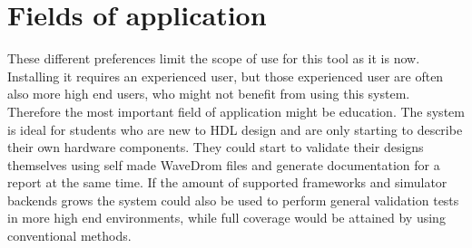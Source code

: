 \section{Fields of application}
These different preferences limit the scope of use for this tool as it is now. Installing it requires an experienced user, but those experienced user are often also more high end users, who might not benefit from using this system. Therefore the most important field of application might be education. The system is ideal for students who are new to HDL design and are only starting to describe their own hardware components. They could start to validate their designs themselves using self made WaveDrom files and generate documentation for a report at the same time.
\npar
If the amount of supported frameworks and simulator backends grows the system could also be used to perform general validation tests in more high end environments, while full coverage would be attained by using conventional methods.
